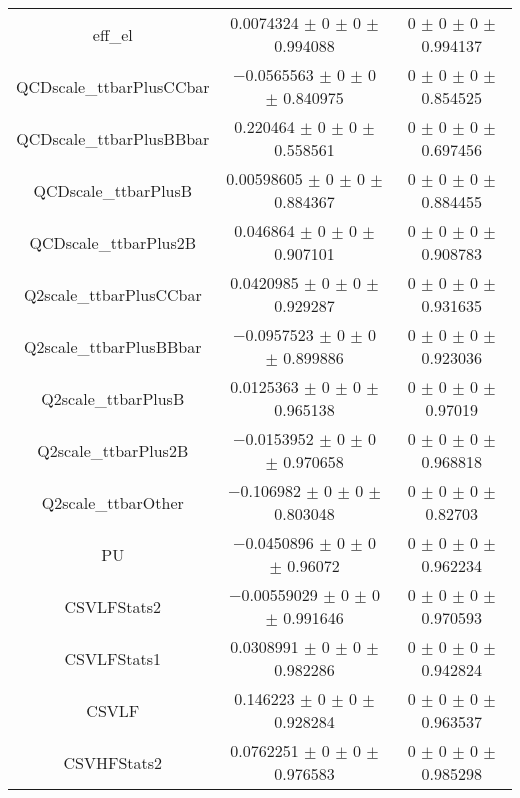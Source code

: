 \begin{table}
\begin{tabular}{ccc}
eff\_el & \num{0.0074324} $\pm$ \num{0} $\pm$ \num{0} $\pm$ \num{0.994088} & \num{0} $\pm$ \num{0} $\pm$ \num{0} $\pm$ \num{0.994137}\\
QCDscale\_ttbarPlusCCbar & \num{-0.0565563} $\pm$ \num{0} $\pm$ \num{0} $\pm$ \num{0.840975} & \num{0} $\pm$ \num{0} $\pm$ \num{0} $\pm$ \num{0.854525}\\
QCDscale\_ttbarPlusBBbar & \num{0.220464} $\pm$ \num{0} $\pm$ \num{0} $\pm$ \num{0.558561} & \num{0} $\pm$ \num{0} $\pm$ \num{0} $\pm$ \num{0.697456}\\
QCDscale\_ttbarPlusB & \num{0.00598605} $\pm$ \num{0} $\pm$ \num{0} $\pm$ \num{0.884367} & \num{0} $\pm$ \num{0} $\pm$ \num{0} $\pm$ \num{0.884455}\\
QCDscale\_ttbarPlus2B & \num{0.046864} $\pm$ \num{0} $\pm$ \num{0} $\pm$ \num{0.907101} & \num{0} $\pm$ \num{0} $\pm$ \num{0} $\pm$ \num{0.908783}\\
Q2scale\_ttbarPlusCCbar & \num{0.0420985} $\pm$ \num{0} $\pm$ \num{0} $\pm$ \num{0.929287} & \num{0} $\pm$ \num{0} $\pm$ \num{0} $\pm$ \num{0.931635}\\
Q2scale\_ttbarPlusBBbar & \num{-0.0957523} $\pm$ \num{0} $\pm$ \num{0} $\pm$ \num{0.899886} & \num{0} $\pm$ \num{0} $\pm$ \num{0} $\pm$ \num{0.923036}\\
Q2scale\_ttbarPlusB & \num{0.0125363} $\pm$ \num{0} $\pm$ \num{0} $\pm$ \num{0.965138} & \num{0} $\pm$ \num{0} $\pm$ \num{0} $\pm$ \num{0.97019}\\
Q2scale\_ttbarPlus2B & \num{-0.0153952} $\pm$ \num{0} $\pm$ \num{0} $\pm$ \num{0.970658} & \num{0} $\pm$ \num{0} $\pm$ \num{0} $\pm$ \num{0.968818}\\
Q2scale\_ttbarOther & \num{-0.106982} $\pm$ \num{0} $\pm$ \num{0} $\pm$ \num{0.803048} & \num{0} $\pm$ \num{0} $\pm$ \num{0} $\pm$ \num{0.82703}\\
PU & \num{-0.0450896} $\pm$ \num{0} $\pm$ \num{0} $\pm$ \num{0.96072} & \num{0} $\pm$ \num{0} $\pm$ \num{0} $\pm$ \num{0.962234}\\
CSVLFStats2 & \num{-0.00559029} $\pm$ \num{0} $\pm$ \num{0} $\pm$ \num{0.991646} & \num{0} $\pm$ \num{0} $\pm$ \num{0} $\pm$ \num{0.970593}\\
CSVLFStats1 & \num{0.0308991} $\pm$ \num{0} $\pm$ \num{0} $\pm$ \num{0.982286} & \num{0} $\pm$ \num{0} $\pm$ \num{0} $\pm$ \num{0.942824}\\
CSVLF & \num{0.146223} $\pm$ \num{0} $\pm$ \num{0} $\pm$ \num{0.928284} & \num{0} $\pm$ \num{0} $\pm$ \num{0} $\pm$ \num{0.963537}\\
CSVHFStats2 & \num{0.0762251} $\pm$ \num{0} $\pm$ \num{0} $\pm$ \num{0.976583} & \num{0} $\pm$ \num{0} $\pm$ \num{0} $\pm$ \num{0.985298}\\

\end{tabular}
\end{table}
